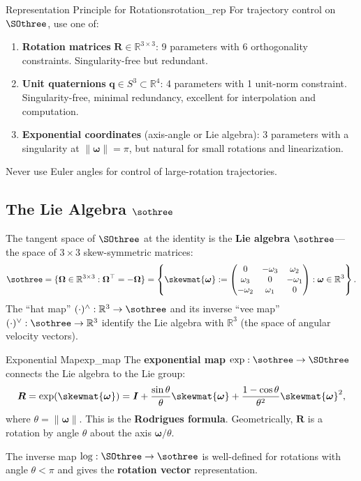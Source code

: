 \documentclass[12pt, openany]{book}
\theoremstyle{plain}
\newcommand{\Reals}{\mathbb{R}}
\newcommand{\norm}[1]{\left\lVert #1 \right\rVert}
\begin{document}
\begin{principle}{Representation Principle for Rotations}{rotation_rep}
  For trajectory control on $\SOthree$, use one of:
  \begin{enumerate}[label=(\alph*)]
    \item \textbf{Rotation matrices} $\bm{R} \in \Reals^{3 \times 3}$: 9
      parameters with 6 orthogonality constraints. Singularity-free but
      redundant.
    \item \textbf{Unit quaternions} $\bm{q} \in S^3 \subset \Reals^4$: 4
      parameters with 1 unit-norm constraint. Singularity-free, minimal
      redundancy, excellent for interpolation and computation.
    \item \textbf{Exponential coordinates} (axis-angle or Lie algebra):
      3 parameters with a singularity at $\norm{\bm{\omega}} = \pi$, but
      natural for small rotations and linearization.
  \end{enumerate}
  Never use Euler angles for control of large-rotation trajectories.
\end{principle}

\subsection{The Lie Algebra $\sothree$}

The tangent space of $\SOthree$ at the identity is the \textbf{Lie algebra}
$\sothree$---the space of $3 \times 3$ skew-symmetric matrices:
\begin{equation}
  \sothree = \{\bm{\Omega} \in \Reals^{3\times 3} :
  \bm{\Omega}^\top = -\bm{\Omega}\}
  = \left\{ \skewmat{\bm{\omega}} :=
  \begin{pmatrix} 0 & -\omega_3 & \omega_2 \\
  \omega_3 & 0 & -\omega_1 \\ -\omega_2 & \omega_1 & 0 \end{pmatrix}
  : \bm{\omega} \in \Reals^3 \right\}.
\end{equation}
The ``hat map'' $(\cdot)^\wedge: \Reals^3 \to \sothree$ and its inverse
``vee map'' $(\cdot)^\vee: \sothree \to \Reals^3$ identify the Lie algebra
with $\Reals^3$ (the space of angular velocity vectors).

\begin{definition}{Exponential Map}{exp_map}
  The \textbf{exponential map} $\exp: \sothree \to \SOthree$ connects the
  Lie algebra to the Lie group:
  \begin{equation}\label{eq:exp_map}
    \bm{R} = \exp(\skewmat{\bm{\omega}})
    = \bm{I} + \frac{\sin\theta}{\theta}\skewmat{\bm{\omega}}
    + \frac{1 - \cos\theta}{\theta^2}\skewmat{\bm{\omega}}^2,
  \end{equation}
  where $\theta = \norm{\bm{\omega}}$. This is the \textbf{Rodrigues formula}.
  Geometrically, $\bm{R}$ is a rotation by angle $\theta$ about the axis
  $\bm{\omega}/\theta$.

  The inverse map $\log: \SOthree \to \sothree$ is well-defined for
  rotations with angle $\theta < \pi$ and gives the \textbf{rotation vector}
  representation.
\end{definition}
\end{document}
